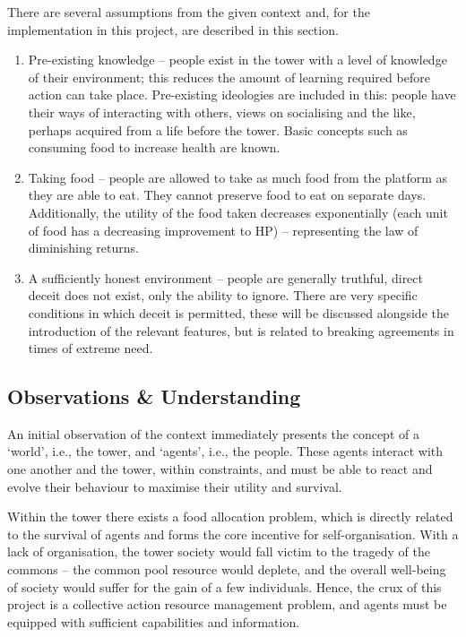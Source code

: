 There are several assumptions from the given context and, for the implementation in this project, are described in this section.

\begin{enumerate}
    \item  Pre-existing knowledge -- people exist in the tower with a level of knowledge of their environment; this reduces the amount of learning required before action can take place. Pre-existing ideologies are included in this: people have their ways of interacting with others, views on socialising and the like, perhaps acquired from a life before the tower.
     Basic concepts such as consuming food to increase health are known.
      \item  Taking food -- people are allowed to take as much food from the platform as they are able to eat. They cannot preserve food to eat on separate days. Additionally, the utility of the food taken decreases exponentially (each unit of food has a decreasing improvement to HP) -- representing the law of diminishing returns.
      \item A sufficiently honest environment – people are generally truthful, direct deceit does not exist, only the ability to ignore. There are very specific conditions in which deceit is permitted, these will be discussed alongside the introduction of the relevant features, but is related to breaking agreements in times of extreme need.

\end{enumerate}

\subsection{Observations \& Understanding}

An initial observation of the context immediately presents the concept of a `world', i.e., the tower, and `agents', i.e.,  the people. These agents interact with one another and the tower, within constraints, and must be able to react and evolve their behaviour to maximise their utility and survival.
 
 
Within the tower there exists a food allocation problem, which is directly related to the survival of agents and forms the core incentive for self-organisation. With a lack of organisation, the tower society would fall victim to the tragedy of the commons -- the common pool resource would deplete, and the overall well-being of society would suffer for the gain of a few individuals. Hence, the crux of this project is a collective action resource management problem, and agents must be equipped with sufficient capabilities and information.
 
